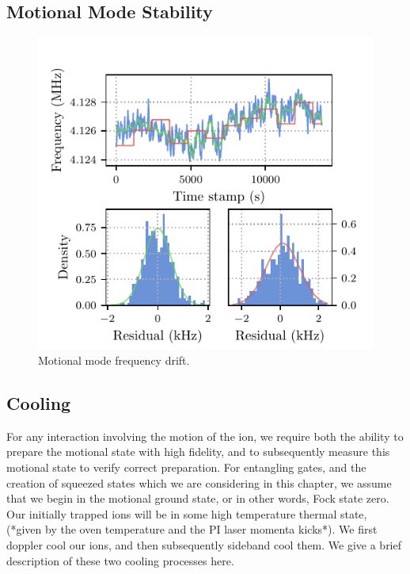 \documentclass[12pt]{report}
\begin{document}
\subsection{Motional Mode Stability}
    \begin{figure}
        \begin{center}
        \noindent\includegraphics[width=\linewidth]{
            figures/pdf_figure/mode_drift.pdf
            }
        \end{center}
        \caption{
            Motional mode frequency drift.
            }
        \label{fig:mode drift}
    \end{figure}

\subsection{Cooling}
\label{sec:Cooling}
    For any interaction involving the motion of the ion, we require both the
    ability to prepare the motional state with high fidelity, and to
    subsequently measure this motional state to verify correct preparation. For
    entangling gates, and the creation of squeezed states which we are
    considering in this chapter, we assume that we begin in the motional ground
    state, or in other words, Fock state zero.  Our initially trapped ions will
    be in some high temperature thermal state, (*given by the oven temperature
    and the PI laser momenta kicks*). We first doppler cool our ions, and then
    subsequently sideband cool them. We give a brief description of these two
    cooling processes here.\\
\end{document}
